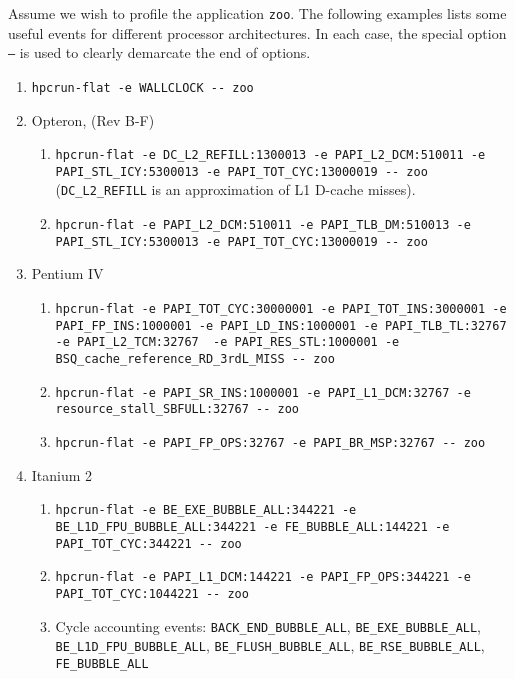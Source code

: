 \documentclass[english]{article}
\begin{document}
Assume we wish to profile the application \texttt{zoo}.
The following examples lists some useful events for different processor architectures.
In each case, the special option \texttt{--} is used to clearly demarcate the end of  options.

\begin{enumerate}
\item \verb+hpcrun-flat -e WALLCLOCK -- zoo+
\item Opteron, (Rev B-F)
  \begin{enumerate}
    \item \verb+hpcrun-flat -e DC_L2_REFILL:1300013 -e PAPI_L2_DCM:510011 -e PAPI_STL_ICY:5300013 -e PAPI_TOT_CYC:13000019 -- zoo+ (\verb+DC_L2_REFILL+ is an approximation of L1 D-cache misses).
    \item \verb+hpcrun-flat -e PAPI_L2_DCM:510011 -e PAPI_TLB_DM:510013 -e PAPI_STL_ICY:5300013 -e PAPI_TOT_CYC:13000019 -- zoo+
  \end{enumerate}

\item Pentium IV 
  \begin{enumerate}
    \item \verb+hpcrun-flat -e PAPI_TOT_CYC:30000001 -e PAPI_TOT_INS:3000001 -e PAPI_FP_INS:1000001 -e PAPI_LD_INS:1000001 -e PAPI_TLB_TL:32767  -e PAPI_L2_TCM:32767  -e PAPI_RES_STL:1000001 -e BSQ_cache_reference_RD_3rdL_MISS -- zoo+
    \item \verb+hpcrun-flat -e PAPI_SR_INS:1000001 -e PAPI_L1_DCM:32767 -e resource_stall_SBFULL:32767 -- zoo+
    \item \verb+hpcrun-flat -e PAPI_FP_OPS:32767 -e PAPI_BR_MSP:32767 -- zoo+
  \end{enumerate}

\item Itanium 2
  \begin{enumerate}
    \item \verb+hpcrun-flat -e BE_EXE_BUBBLE_ALL:344221 -e BE_L1D_FPU_BUBBLE_ALL:344221 -e FE_BUBBLE_ALL:144221 -e PAPI_TOT_CYC:344221 -- zoo+
    \item \verb+hpcrun-flat -e PAPI_L1_DCM:144221 -e PAPI_FP_OPS:344221 -e PAPI_TOT_CYC:1044221 -- zoo+
    \item Cycle accounting events: \verb+BACK_END_BUBBLE_ALL+, \verb+BE_EXE_BUBBLE_ALL+, \verb+BE_L1D_FPU_BUBBLE_ALL+, \verb+BE_FLUSH_BUBBLE_ALL+, \verb+BE_RSE_BUBBLE_ALL+, \verb+FE_BUBBLE_ALL+
  \end{enumerate}

\end{enumerate}
\end{document}
